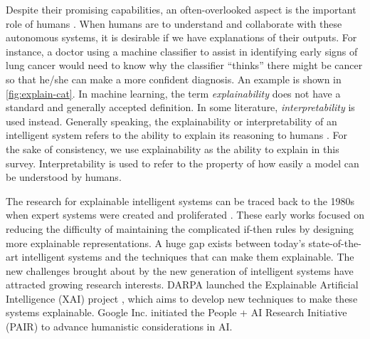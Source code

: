 Despite their promising capabilities, an often-overlooked aspect is the important role of humans \cite{ribeiro2016kdd}. When humans are to understand and collaborate with these autonomous systems, it is desirable if we have explanations of their outputs. For instance, a doctor using a machine classifier to assist in identifying early signs of lung cancer would need to know why the classifier ``thinks'' there might be cancer so that he/she can make a more confident diagnosis. An example is shown in \autoref{fig:explain-cat}. In machine learning, the term \textit{explainability} does not have a standard and generally accepted definition. In some literature, \textit{interpretability} is used instead. Generally speaking, the explainability or interpretability of an intelligent system refers to the ability to explain its reasoning to humans \cite{doshi-velez2017interpretableml}. For the sake of consistency, we use explainability as the ability to explain in this survey. Interpretability is used to refer to the property of how easily a model can be understood by humans.

The research for explainable intelligent systems can be traced back to the 1980s when expert systems were created and proliferated \cite{clancey1981tech, neches1985tse, swartout1991expert}. These early works focused on reducing the difficulty of maintaining the complicated if-then rules by designing more explainable representations.
A huge gap exists between today's state-of-the-art intelligent systems and the techniques that can make them explainable. The new challenges brought about by the new generation of intelligent systems have attracted growing research interests. DARPA launched the Explainable Artificial Intelligence (XAI) project \cite{darpa2017xai}, which aims to develop new techniques to make these systems explainable. Google Inc. initiated the People + AI Research Initiative (PAIR) \cite{google2017pair} to advance humanistic considerations in AI.


